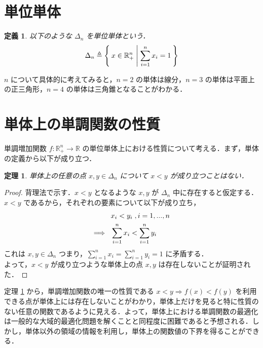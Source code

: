 \documentclass[a4paper,11pt]{jreport}
\newtheorem{definition}{定義}
\newtheorem{theorem}{定理}
\begin{document}
\section{単位単体}

\begin{definition}
以下のような $ \Delta_n $ を単位単体という．
$$ \Delta_n \triangleq \Set{ x \in \mathbb{R}^n_{+} | \sum_{i=1}^{n} x_i = 1 } $$
\end{definition}

$ n $ について具体的に考えてみると，$ n=2 $ の単体は線分，$ n=3 $ の単体は平面上の正三角形，$ n=4 $ の単体は三角錐となることがわかる．\par

\section{単体上の単調関数の性質}

単調増加関数 $ f : \mathbb{R}^n_{+} \to \mathbb{R} $ の単位単体上における性質について考える．まず，単体の定義から以下が成り立つ．

\begin{theorem} \label{thm:inequality_on_simplex}
単体上の任意の点 $ x, y \in \Delta_n $ について $ x < y $ が成り立つことはない．
\end{theorem}

\begin{proof}
背理法で示す．$ x < y $ となるような $ x, y $ が $ \Delta_n $ 中に存在すると仮定する．\\
$ x < y $ であるから，それぞれの要素について以下が成り立ち，
\begin{align}
& x_i < y_i \;, i = 1, ..., n \notag \\
\Longrightarrow \hspace{8pt} & \sum_{i=1}^n x_i < \sum_{i=1}^n y_i \notag
\end{align}
これは $ x, y \in \Delta_n $ つまり，$ \sum_{i=1}^n x_i = \sum_{i=1}^n y_i = 1 $ に矛盾する．\\
よって，$ x < y $ が成り立つような単体上の点 $ x, y $ は存在しないことが証明された．
\end{proof}

定理 \ref{thm:inequality_on_simplex} から，単調増加関数の唯一の性質である $ x < y \Rightarrow f(x) < f(y) $ を利用できる点が単体上には存在しないことがわかり，単体上だけを見ると特に性質のない任意の関数であるように見える．よって，単体上における単調関数の最適化は一般的な大域的最適化問題を解くことと同程度に困難であると予想される．しかし，単体以外の領域の情報を利用し，単体上の関数値の下界を得ることができる．
\end{document}
